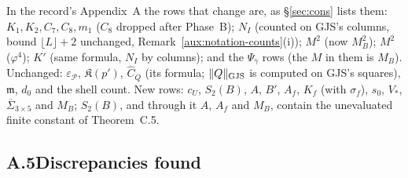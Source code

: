 In the record's Appendix~A \cite[p.~35]{R} the rows that change are, as \S\ref{sec:cons} lists
them: $K_1,K_2,C_7,C_8,m_1$ ($C_8$ dropped after Phase~B); $N_I$ (counted on GJS's columns, bound
$\lfloor L\rfloor+2$ unchanged, Remark~\ref{aux:notation-counts}(i)); $M^2$ (now $M_B^2$); $M^2$
($\varphi^4$); $K'$ (same formula, $N_I$ by columns); and the $\Psi_\gamma$ rows (the $M$ in them
is $M_B$).  Unchanged: $\varepsilon_{\mathscr P}$, $\mathfrak K(p')$, $\widehat C_Q$ (its formula;
$\lVert Q\rVert_{\mathrm{GJS}}$ is computed on GJS's squares), $\mathfrak m$, $d_0$ and the shell count.  New rows: $c_U$,
$S_2(B)$, $A$, $B'$, $A_f$, $K_f$ (with $\sigma_f$), $s_0$, $V_*$, $\overline\Sigma_{3\times5}$ and
$M_B$; $S_2(B)$, and through it $A$, $A_f$ and $M_B$, contain the unevaluated finite constant of
Theorem~C.5.

\subsection*{A.5\quad Discrepancies found}

